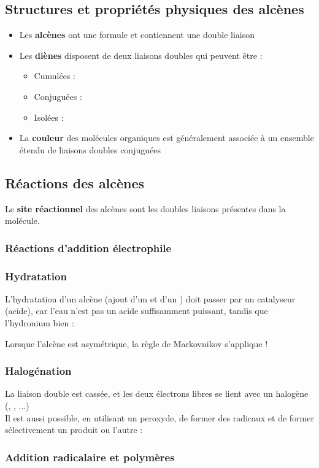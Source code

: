 \documentclass{article}
\newcommand{\insertslide}[2]{
\begin{center}
    \fbox{\texttt{[image: \#1]}}
\end{center}
}
\begin{document}
    \subsection{Structures et propriétés physiques des alcènes}
        \begin{itemize}
            \item Les \textbf{alcènes} ont une formule  et contiennent une double liaison 
            \item Les \textbf{diènes} disposent de deux liaisons doubles  qui peuvent être :
            \begin{itemize}
                \item Cumulées : 
                \item Conjuguées : 
                \item Isolées : 
            \end{itemize}
            \item La \textbf{couleur} des molécules organiques est généralement associée à un ensemble étendu de liaisons doubles conjuguées
        \end{itemize}
\pagebreak
    \subsection{Réactions des alcènes}
        Le \textbf{site réactionnel} des alcènes sont les doubles liaisons présentes dans la molécule.

        \subsubsection{Réactions d'addition électrophile}
            \insertslide{Slides/CM4}{24}
            \insertslide{Slides/CM4}{26}
            \insertslide{Slides/CM4}{27}
\pagebreak
        \subsubsection{Hydratation}
            L'hydratation d'un alcène (ajout d'un  et d'un ) doit passer par un catalyseur (acide), car l'eau n'est pas un acide suffisamment puissant, tandis que l'hydronium bien :
            \insertslide{Slides/CM4}{30}
            Lorsque l'alcène est asymétrique, la règle de Markovnikov s'applique !
        
        \subsubsection{Halogénation}
            La liaison double est cassée, et les deux électrons libres se lient avec un halogène (, , ...)\\
            Il est aussi possible, en utilisant un peroxyde, de former des radicaux et de former sélectivement un produit ou l'autre : 
            \insertslide{Slides/CM4}{34}
            \insertslide{Slides/CM4}{35}
        
        \subsubsection{Addition radicalaire et polymères}
            \insertslide{Slides/CM4}{37}
\end{document}
